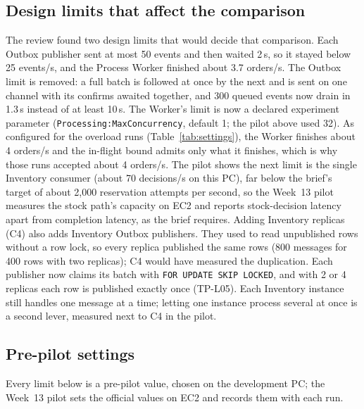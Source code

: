 \documentclass[12pt,a4paper]{article}
\begin{document}
\subsection{Design limits that affect the comparison}
The review found two design limits that would decide that
comparison. Each Outbox publisher sent at most 50 events and then waited 2\,s,
so it stayed below 25 events/s, and the Process Worker finished about 3.7
orders/s. The Outbox limit is removed: a full batch is followed at once by the
next and is sent on one channel with its confirms awaited together, and 300
queued events now drain in 1.3\,s instead of at least 10\,s. The Worker's
limit is now a declared experiment parameter (\texttt{Processing:MaxConcurrency},
default 1; the pilot above used 32). As configured for the overload runs
(Table~\ref{tab:settings}), the Worker finishes about 4 orders/s and the
in-flight bound admits only what it finishes, which is why those runs accepted
about 4 orders/s. The pilot shows the next limit is the single Inventory
consumer (about 70 decisions/s on this PC), far below the brief's target of
about 2,000 reservation attempts per second, so the Week~13 pilot measures the
stock path's capacity on EC2 and reports stock-decision latency apart from
completion latency, as the brief requires. Adding Inventory replicas (C4)
also adds Inventory Outbox publishers. They used to read unpublished rows
without a row lock, so every replica published the same rows (800 messages for
400 rows with two replicas); C4 would have measured the duplication. Each
publisher now claims its batch with \texttt{FOR UPDATE SKIP LOCKED}, and with 2
or 4 replicas each row is published exactly once (TP-L05). Each Inventory
instance still handles one message at a time; letting one instance process
several at once is a second lever, measured next to C4 in the pilot.

\subsection{Pre-pilot settings}
Every limit below is a pre-pilot value, chosen on the development PC; the
Week~13 pilot sets the official values on EC2 and records them with each run.
\end{document}
